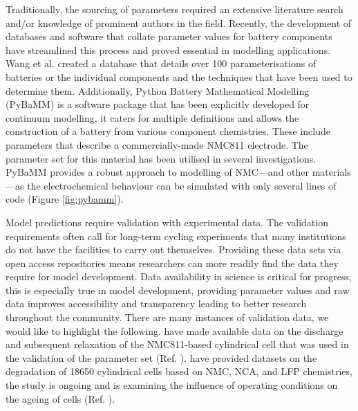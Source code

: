 \documentclass[journal=jacsat,manuscript=article]{achemso}
\begin{document}
Traditionally, the sourcing of parameters required an extensive literature search and/or knowledge of prominent authors in the field. Recently, the development of databases and software that collate parameter values for battery components have streamlined this process and proved essential in modelling applications. \cite{Tranter2020,Tranter_2020b} Wang et al. created a database that details over 100 parameterisations of batteries or the individual components and the techniques that have been used to determine them. Additionally, Python Battery Mathematical Modelling (PyBaMM) is a software package that has been explicitly developed for continuum modelling, it caters for multiple definitions and allows the construction of a battery from various component chemistries.\cite{Sulzer_2020} These include parameters that describe a commercially-made NMC811 electrode.\cite{Chen2020} The parameter set for this material has been utilised in several investigations.\cite{Tranter2020,Tranter_2020b} PyBaMM provides a robust approach to modelling of NMC—and other materials—as the electrochemical behaviour can be simulated with only several lines of code (Figure \ref{fig:pybamm}).

Model predictions require validation with experimental data. The validation requirements often call for long-term cycling experiments that many institutions do not have the facilities to carry out themselves. Providing these data sets via open access repositories means researchers can more readily find the data they require for model development.  Data availability in science is critical for progress, this is especially true in model development, providing parameter values and raw data improves accessibility and transparency leading to better research throughout the community. There are many instances of validation data, we would like to highlight the following. \citeauthor{Chen2020} have made available data on the discharge and subsequent relaxation of the NMC811-based cylindrical cell that was used in the validation of the parameter set (Ref. ). \cite{Chen2020} \citeauthor{Devie_2018} have provided datasets on the degradation of 18650 cylindrical cells based on NMC, NCA, and LFP chemistries, the study is ongoing and is examining the influence of operating conditions on the ageing of cells (Ref. ). \cite{Devie_2018}
\end{document}
